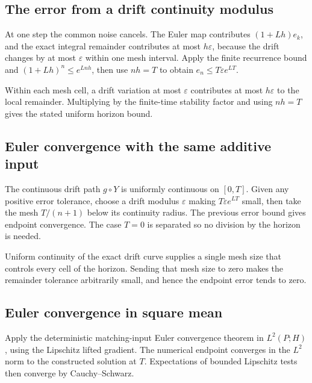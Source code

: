 \documentclass[11pt,a4paper]{article}
\begin{document}
\subsection{\texorpdfstring{The error from a drift continuity modulus}{The error from a drift continuity modulus}}


At one step the common noise cancels. The Euler map contributes \((1+Lh)e_k\), and the exact integral remainder contributes at most \(h\varepsilon\), because the drift changes by at most \(\varepsilon\) within one mesh interval. Apply the finite recurrence bound and \((1+Lh)^n\le e^{Lnh}\), then use \(nh=T\) to obtain \(e_n\le T\varepsilon e^{LT}\).



Within each mesh cell, a drift variation at most \(\varepsilon\) contributes at most \(h\varepsilon\) to the local remainder. Multiplying by the finite-time stability factor and using \(nh=T\) gives the stated uniform horizon bound.


\subsection{\texorpdfstring{Euler convergence with the same additive input}{Euler convergence with the same additive input}}


The continuous drift path \(g\circ Y\) is uniformly continuous on \([0,T]\). Given any positive error tolerance, choose a drift modulus \(\varepsilon\) making \(T\varepsilon e^{LT}\) small, then take the mesh \(T/(n+1)\) below its continuity radius. The previous error bound gives endpoint convergence. The case \(T=0\) is separated so no division by the horizon is needed.



Uniform continuity of the exact drift curve supplies a single mesh size that controls every cell of the horizon. Sending that mesh size to zero makes the remainder tolerance arbitrarily small, and hence the endpoint error tends to zero.


\subsection{\texorpdfstring{Euler convergence in square mean}{Euler convergence in square mean}}


Apply the deterministic matching-input Euler convergence theorem in \(L^2(P;H)\), using the Lipschitz lifted gradient. The numerical endpoint converges in the \(L^2\) norm to the constructed solution at \(T\). Expectations of bounded Lipschitz tests then converge by Cauchy–Schwarz.
\end{document}
